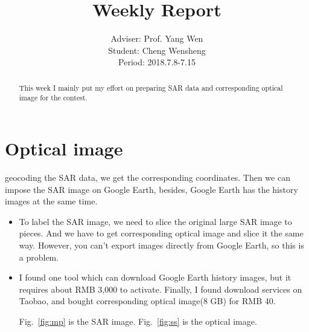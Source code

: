 \documentclass[]{IEEEtran}
\begin{document}
	\title{Weekly Report}
	\author{Adviser: Prof. Yang Wen \\Student: Cheng Wensheng\\ Period: 2018.7.8-7.15
	}
	\maketitle

\begin{abstract}
	This week I mainly put my effort on preparing SAR data and corresponding optical image for the contest.
\end{abstract}

\section{Optical image}
	 geocoding the SAR data, we get the corresponding coordinates. Then we can impose the SAR image on Google Earth, besides, Google Earth has the history images at the same time.
	\begin{itemize}
		\item To label the SAR image, we need to slice the original large SAR image to pieces. And we have to get corresponding optical image and slice it the same way. However, you can't export images directly from Google Earth, so this is a problem.
		\item I found one tool which can download Google Earth history images, but it requires about RMB 3,000 to activate. Finally, I found download services on Taobao, and bought corresponding optical image(8 GB) for RMB 40.
		
		Fig.~\ref{fig:mp} is the SAR image. Fig.~\ref{fig:ss} is the optical image.
	\end{itemize}

\end{document}
